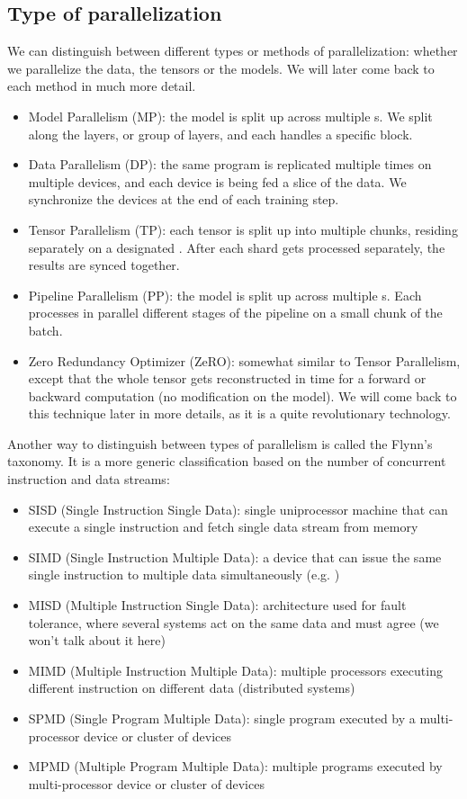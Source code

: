 \documentclass{article}
\begin{document}
\subsection{Type of parallelization}
We can distinguish between different types or methods of parallelization: whether we parallelize the data, the tensors or the models. We will later come back to each method in much more detail.
\begin{itemize}
  \item Model Parallelism (MP): the model is split up across multiple s. We split along the layers, or group of layers, and each  handles a specific block.
  \item Data Parallelism (DP): the same program is replicated multiple times on multiple devices, and each device is being fed a slice of the data. We synchronize the devices at the end of each training step.
  \item Tensor Parallelism (TP): each tensor is split up into multiple chunks, residing separately on a designated . After each shard gets processed separately, the results are synced together.
  \item Pipeline Parallelism (PP): the model is split up across multiple s. Each  processes in parallel different stages of the pipeline on a small chunk of the batch.
  \item Zero Redundancy Optimizer (ZeRO): somewhat similar to Tensor Parallelism, except that the whole tensor gets reconstructed in time for a forward or backward computation (no modification on the model). We will come back to this technique later in more details, as it is a quite revolutionary technology.
\end{itemize}

Another way to distinguish between types of parallelism is called the Flynn's taxonomy. It is a more generic classification based on the number of concurrent instruction and data streams:
\begin{itemize}
  \item SISD (Single Instruction Single Data): single uniprocessor machine that can execute a single instruction and fetch single data stream from memory
  \item SIMD (Single Instruction Multiple Data): a device that can issue the same single instruction to multiple data simultaneously (e.g. )
  \item MISD (Multiple Instruction Single Data): architecture used for fault tolerance, where several systems act on the same data and must agree (we won't talk about it here)
  \item MIMD (Multiple Instruction Multiple Data): multiple processors executing different instruction on different data (distributed systems)
  \item SPMD (Single Program Multiple Data): single program executed by a multi-processor device or cluster of devices
  \item MPMD (Multiple Program Multiple Data): multiple programs executed by multi-processor device or cluster of devices
\end{itemize}
\end{document}
